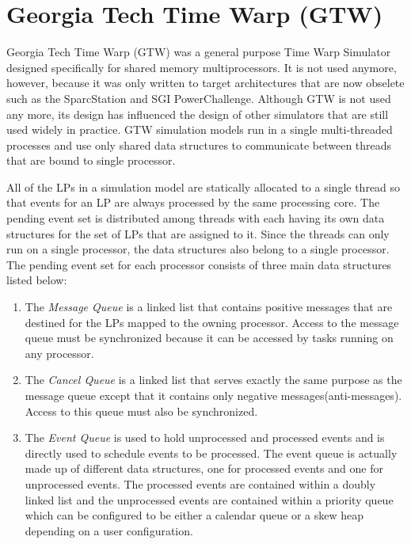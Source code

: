 \documentclass[11pt]{book}
\begin{document}
\section{Georgia Tech Time Warp (GTW)}


Georgia Tech Time Warp \cite{das-94} (GTW) was a general purpose Time Warp Simulator designed
specifically for shared memory multiprocessors.  It is not used anymore,
however, because it was only written to target architectures that are now obselete such as
the SparcStation and SGI PowerChallenge.  Although GTW is not used any more, its design
has influenced the design of other simulators that are still used widely in practice.  GTW
simulation models run in a single multi-threaded processes and use only shared data
structures to communicate between threads that are bound to single processor.

All of the LPs in a simulation model are statically allocated to a single thread so that
events for an LP are always processed by the same processing core.  The pending event set
is distributed among threads with each having its own data structures for the set of LPs
that are assigned to it.  Since the threads can only run on a single processor, the data
structures also belong to a single processor.  The pending event set for each processor
consists of three main data structures listed below\cite{das-94}:

\begin{enumerate}
\item The \emph{Message Queue} is a linked list that contains positive messages that are
  destined for the LPs mapped to the owning processor.  Access to the message queue must
  be synchronized because it can be accessed by tasks running on any processor.
\item The \emph{Cancel Queue} is a linked list that serves exactly the same purpose as the
  message queue except that it contains only negative messages(anti-messages).  Access to
  this queue must also be synchronized.
\item The \emph{Event Queue} is used to hold unprocessed and processed events and is
  directly used to schedule events to be processed.  The event queue is actually made up
  of different data structures, one for processed events and one for unprocessed events.
  The processed events are contained within a doubly linked list and the unprocessed
  events are contained within a priority queue which can be configured to be either a
  calendar queue or a skew heap depending on a user configuration.
\end{enumerate}
\end{document}
